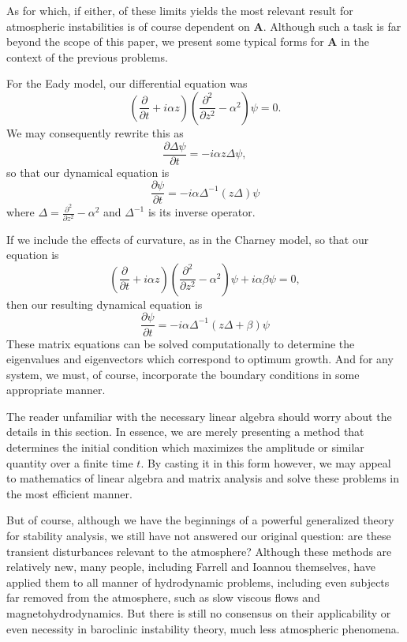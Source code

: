 \documentclass[letterpaper,11pt,onecolumn,twoside,titlepage]{article}
\newcommand{\pdiff}[2]{\frac{\partial #1}{\partial #2}}
\begin{document}
As for which, if either, of these limits yields the most relevant result for atmospheric instabilities is of course dependent on $\mathbf{A}$. Although such a task is far beyond the scope of this paper, we present some typical forms for $\mathbf{A}$ in the context of the previous problems.

For the Eady model, our differential equation was
\[
\left(\pdiff{}{t} + i \alpha z \right)\left(\pdiff{^2}{z^2} - \alpha^2\right) \psi = 0.
\]
We may consequently rewrite this as
\[
\pdiff{\Delta \psi}{t} = - i \alpha z \Delta \psi,
\]
so that our dynamical equation is
\[
\pdiff{\psi}{t} = -i \alpha \Delta^{-1} (z \Delta) \psi
\]
where $\Delta = \pdiff{^2}{z^2} - \alpha^2$ and $\Delta^{-1}$ is its inverse operator.

If we include the effects of curvature, as in the Charney model, so that our equation is
\[
\left(\pdiff{}{t} + i \alpha z \right)\left(\pdiff{^2}{z^2} - \alpha^2\right) \psi + i \alpha \beta \psi = 0,
\]
then our resulting dynamical equation is
\[
\pdiff{\psi}{t} = -i \alpha \Delta^{-1} (z \Delta + \beta) \psi
\]
These matrix equations can be solved computationally to determine the eigenvalues and eigenvectors which correspond to optimum growth. And for any system, we must, of course, incorporate the boundary conditions in some appropriate manner.

The reader unfamiliar with the necessary linear algebra should worry about the details in this section. In essence, we are merely presenting a method that determines the initial condition which maximizes the amplitude or similar quantity over a finite time $t$. By casting it in this form however, we may appeal to mathematics of linear algebra and matrix analysis and solve these problems in the most efficient manner.

But of course, although we have the beginnings of a powerful generalized theory for stability analysis, we still have not answered our original question: are these transient disturbances relevant to the atmosphere? Although these methods are relatively new, many people, including Farrell and Ioannou themselves, have applied them to all manner of hydrodynamic problems, including even subjects far removed from the atmosphere, such as slow viscous flows and magnetohydrodynamics. But there is still no consensus on their applicability or even necessity in baroclinic instability theory, much less atmospheric phenomena.

\end{document}
